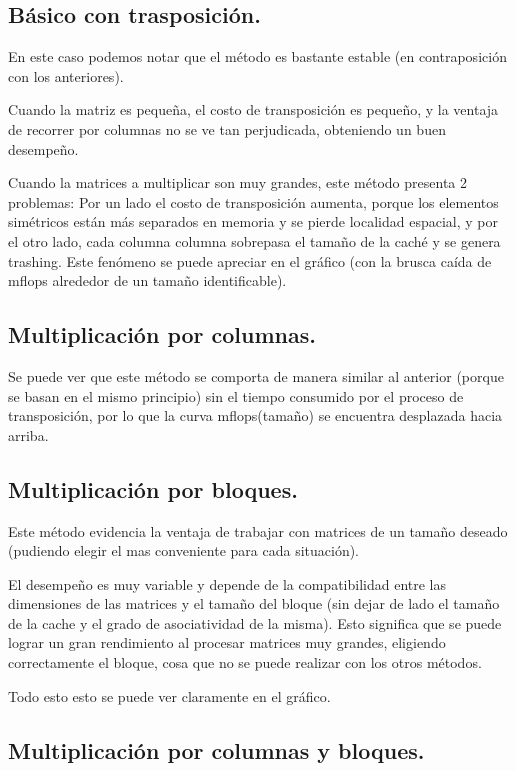 \documentclass[a4paper,10pt]{article}
\begin{document}
\subsection{Básico con trasposición.}

En este caso podemos notar que el método es bastante estable (en contraposición con los anteriores).

Cuando la matriz es pequeña, el costo de transposición es pequeño, y la ventaja de recorrer por columnas no se ve tan perjudicada, obteniendo un buen desempeño. 

Cuando la matrices a multiplicar son muy grandes, este método presenta 2 problemas: Por un lado el costo de transposición aumenta, porque los elementos simétricos están más separados en memoria y se pierde localidad espacial, y por el otro lado, cada columna columna sobrepasa el tamaño de la caché y se genera trashing. Este fenómeno se puede apreciar en el gráfico (con la brusca caída de mflops alrededor de un tamaño identificable).

\subsection{Multiplicación por columnas.}

Se puede ver que este método se comporta de manera similar al anterior (porque se basan en el mismo principio) sin el tiempo consumido por el proceso de transposición, por lo que la curva mflops(tamaño) se encuentra desplazada hacia arriba.

\subsection{Multiplicación por bloques.}

Este método evidencia la ventaja de trabajar con matrices de un tamaño deseado (pudiendo elegir el mas conveniente para cada situación).

El desempeño es muy variable y depende de la compatibilidad entre las dimensiones de las matrices y el tamaño del bloque (sin dejar de lado el tamaño de la cache y el grado de asociatividad de la misma). Esto significa que se puede lograr un gran rendimiento al procesar matrices muy grandes, eligiendo correctamente el bloque, cosa que no se puede realizar con los otros métodos. 

Todo esto esto se puede ver claramente en el gráfico.

\subsection{Multiplicación por columnas y bloques.}
\end{document}
